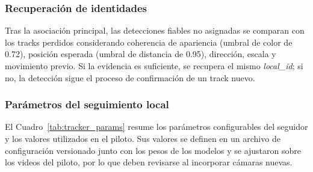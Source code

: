 \documentclass[12pt,letterpaper]{article}
\begin{document}
\subsubsection{Recuperación de identidades}

Tras la asociación principal, las detecciones fiables no asignadas se
comparan con los tracks perdidos considerando coherencia de apariencia
(umbral de color de 0.72), posición esperada (umbral de distancia de
0.95), dirección, escala y movimiento previo. Si la evidencia es
suficiente, se recupera el mismo \textit{local\_id}; si no, la detección
sigue el proceso de confirmación de un track nuevo.

\subsubsection{Parámetros del seguimiento local}

El Cuadro~\ref{tab:tracker_params} resume los parámetros configurables
del seguidor y los valores utilizados en el piloto. Sus valores se
definen en un archivo de configuración versionado junto con los pesos de
los modelos y se ajustaron sobre los videos del piloto, por lo que deben
revisarse al incorporar cámaras nuevas.
\end{document}
